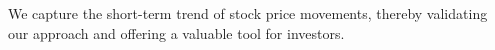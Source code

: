 We capture the short-term trend of stock price movements, thereby validating our approach and offering a valuable tool for investors.